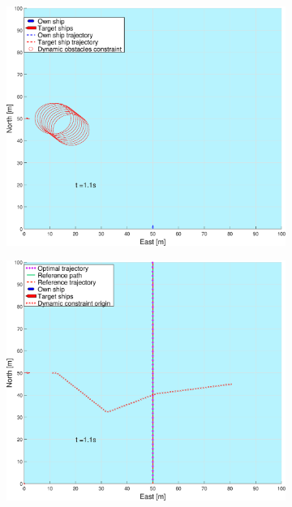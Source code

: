 \begin{figure}[ht!] %
    \begin{subfigure}[b]{0.49\textwidth}
        \centering
        \includegraphics[width=\textwidth]{Images/Figures/enkel_SO/_Simple_0fig1_time=1}
        \subcaption{}
    \end{subfigure}
    \hfill
    \begin{subfigure}[b]{0.499\textwidth}
        \centering
        \includegraphics[width=\textwidth]{Images/Figures/enkel_SO/_Simple_0fig999_time=1}

\end{subfigure}
\end{figure}

